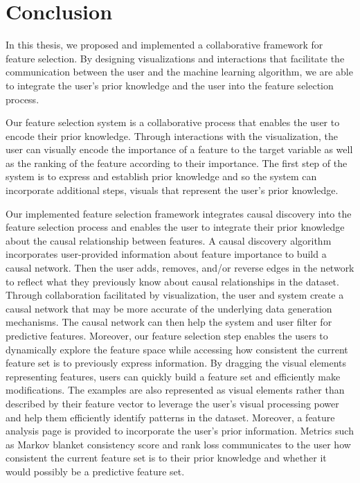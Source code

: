 \chapter { Conclusion }

In this thesis, we proposed and implemented a collaborative framework for feature selection. By designing visualizations and interactions that facilitate the communication between the user and the machine learning algorithm, we are able to integrate the user's prior knowledge and the user into the feature selection process.

Our feature selection system is a collaborative process that enables the user to encode their prior knowledge. Through interactions with the visualization, the user can visually encode the importance of a feature to the target variable as well as the ranking of the feature according to their importance. The first step of the system is to express and establish prior knowledge and so the system can incorporate additional steps, visuals that represent the user's prior knowledge.

Our implemented feature selection framework integrates causal discovery into the feature selection process and enables the user to integrate their prior knowledge about the causal relationship between features. A causal discovery algorithm incorporates user-provided information about feature importance to build a causal network. Then the user adds, removes, and/or reverse edges in the network to reflect what they previously know about causal relationships in the dataset. Through collaboration facilitated by visualization, the user and system create a causal network that may be more accurate of the underlying data generation mechanisms. The causal network can then help the system and user filter for predictive features.
Moreover, our feature selection step enables the users to dynamically explore the feature space while accessing how consistent the current feature set is to previously express information. By dragging the visual elements representing features, users can quickly build a feature set and efficiently make modifications. The examples are also represented as visual elements rather than described by their feature vector to leverage the user's visual processing power and help them efficiently identify patterns in the dataset. Moreover, a feature analysis page is provided to incorporate the user's prior information. Metrics such as Markov blanket consistency score and rank loss communicates to the user how consistent the current feature set is to their prior knowledge and whether it would possibly be a predictive feature set.

